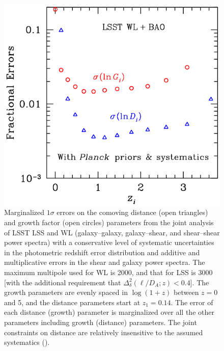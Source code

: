 


\begin{figure}
\includegraphics[width=1.0\hsize,clip]{dges.pdf}
\caption{Marginalized $1\sigma$ errors on the comoving distance
(open triangles) and growth factor (open circles) parameters from
the joint analysis of LSST LSS and WL (galaxy--galaxy, galaxy--shear,
and shear--shear power spectra) with a
conservative level of systematic uncertainties in the photometric redshift error
distribution and additive and multiplicative errors in the shear and
galaxy power spectra. The maximum multipole used for WL is
2000, and that for LSS is 3000 [with the additional requirement that
$\Delta_\delta^2(\ell/D_{A};z) < 0.4$].
The growth parameters
are evenly spaced in
$\log(1+z)$ between $z = 0$ and 5, and the distance parameters
start at $z_1 = 0.14$.
The error of each distance (growth) parameter is marginalized
over all the other parameters including growth (distance) parameters. The joint constraints on
distance are relatively insensitive to the assumed systematics
(\cite{Zhan2009}).}
\label{Fig:bao2}
\end{figure}


